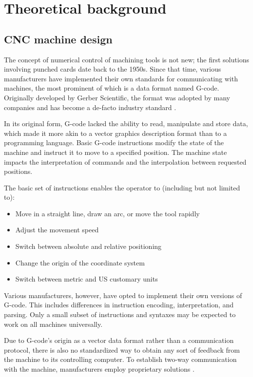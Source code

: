 \clearpage
\section{Theoretical background}

\subsection{CNC machine design}

The concept of numerical control of machining tools is not new; the first
solutions involving punched cards date back to the 1950s. Since that time,
various manufacturers have implemented their own standards for communicating
with machines, the most prominent of which is a data format named G-code.
Originally developed by Gerber Scientific, the format was adopted by many
companies and has become a de-facto industry standard \cite{cnc}.

In its original form, G-code lacked the ability to read, manipulate and store
data, which made it more akin to a vector graphics description format than to a
programming language. Basic G-code instructions modify the state of the machine
and instruct it to move to a specified position. The machine state impacts the
interpretation of commands and the interpolation between requested positions.

The basic set of instructions enables the operator to (including but not
limited to):
\begin{itemize}
    \item Move in a straight line, draw an arc, or move the tool rapidly
    \item Adjust the movement speed
    \item Switch between absolute and relative positioning
    \item Change the origin of the coordinate system
    \item Switch between metric and US customary units
\end{itemize}
Various manufacturers, however, have opted to implement their own versions of
G-code. This includes differences in instruction encoding, interpretation, and
parsing. Only a small subset of instructions and syntaxes may be expected to
work on all machines universally.

Due to G-code's origin as a vector data format rather than a communication
protocol, there is also no standardized way to obtain any sort of feedback from
the machine to its controlling computer. To establish two-way communication
with the machine, manufacturers employ proprietary solutions \cite{monitoring}.

